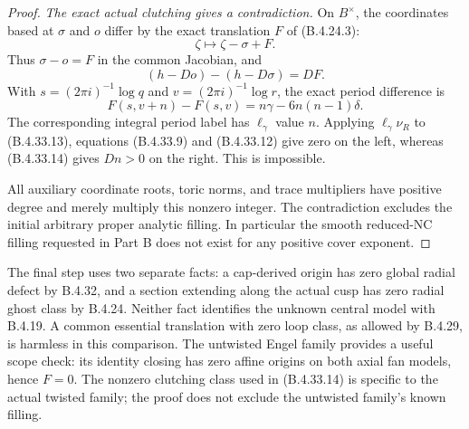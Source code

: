 \begin{proof}
\emph{The exact actual clutching gives a contradiction.}
On $B^\times$, the coordinates based at
$\sigma$ and $o$ differ by the exact
translation $F$ of (B.4.24.3):
\[
 \zeta\longmapsto\zeta-\sigma+F.
\]
Thus $\sigma-o=F$ in the common Jacobian,
and
\[
 (h-D o)-(h-D\sigma)=D F.
 \tag{B.4.33.13}
\]
With $s=(2\pi i)^{-1}\log q$ and
$v=(2\pi i)^{-1}\log r$, the exact
period difference is
\[
 F(s,v+n)-F(s,v)
       =n\gamma-6n(n-1)\delta.
 \tag{B.4.33.14}
\]
The corresponding integral period label
has $\ell_\gamma$ value $n$.
Applying $\ell_\gamma\nu_R$ to
(B.4.33.13), equations (B.4.33.9) and
(B.4.33.12) give zero on the left,
whereas (B.4.33.14) gives $Dn>0$ on
the right. This is impossible.

All auxiliary coordinate roots, toric
norms, and trace multipliers have positive
degree and merely multiply this nonzero
integer. The contradiction excludes the
initial arbitrary proper analytic filling.
In particular the smooth reduced-NC
filling requested in Part B does not
exist for any positive cover exponent.
\end{proof}

The final step uses two separate facts: a
cap-derived origin has zero global radial
defect by B.4.32, and a section extending
along the actual cusp has zero radial
ghost class by B.4.24. Neither fact
identifies the unknown central model with
B.4.19. A common essential translation
with zero loop class, as allowed by
B.4.29, is harmless in this comparison.
The untwisted Engel family provides a
useful scope check: its identity closing
has zero affine origins on both axial
fan models, hence $F=0$. The nonzero
clutching class used in (B.4.33.14)
is specific to the actual twisted
family; the proof does not exclude
the untwisted family's known filling.
